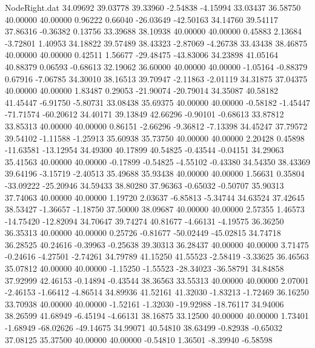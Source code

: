 \begin{filecontents}{NodeRight.dat}
  34.09692   39.03778   39.33960    -2.54838   -4.15994   33.03437   36.58750   40.00000   40.00000    0.96222    0.66040  -26.03649  -42.50163
  34.14760   39.54117   37.86316    -0.36382    0.13756   33.39688   38.10938   40.00000   40.00000    0.45883    2.13684   -3.72801    1.40953
  34.18822   39.57489   38.43323    -2.87069   -4.26738   33.43438   38.46875   40.00000   40.00000    0.42511    1.56677  -29.48475  -43.83006
  34.23898   41.05164   40.88379     0.06593   -0.68613   32.19062   36.60000   40.00000   40.00000   -1.05164   -0.88379    0.67916   -7.06785
  34.30010   38.16513   39.70947    -2.11863   -2.01119   34.31875   37.04375   40.00000   40.00000    1.83487    0.29053  -21.90074  -20.79014
  34.35087   40.58182   41.45447    -6.91750   -5.80731   33.08438   35.69375   40.00000   40.00000   -0.58182   -1.45447  -71.71574  -60.20612
  34.40171   39.13849   42.66296    -0.90101   -0.68613   33.87812   33.85313   40.00000   40.00000    0.86151   -2.66296   -9.36812   -7.13398
  34.45247   37.79572   39.54102    -1.11588   -1.25913   35.60938   35.73750   40.00000   40.00000    2.20428    0.45898  -11.63581  -13.12954
  34.49300   40.17899   40.54825    -0.43544   -0.04151   34.29063   35.41563   40.00000   40.00000   -0.17899   -0.54825   -4.55102   -0.43380
  34.54350   38.43369   39.64196    -3.15719   -2.40513   35.49688   35.93438   40.00000   40.00000    1.56631    0.35804  -33.09222  -25.20946
  34.59433   38.80280   37.96363    -0.65032   -0.50707   35.90313   37.74063   40.00000   40.00000    1.19720    2.03637   -6.85813   -5.34744
  34.63524   37.42645   38.53427    -1.36657   -1.18750   37.50000   38.09687   40.00000   40.00000    2.57355    1.46573  -14.75420  -12.82094
  34.70647   39.74274   40.81677    -4.66131   -4.19575   36.36250   36.35313   40.00000   40.00000    0.25726   -0.81677  -50.02449  -45.02815
  34.74718   36.28525   40.24616    -0.39963   -0.25638   39.30313   36.28437   40.00000   40.00000    3.71475   -0.24616   -4.27501   -2.74261
  34.79789   41.15250   41.55523    -2.58419   -3.33625   36.46563   35.07812   40.00000   40.00000   -1.15250   -1.55523  -28.34023  -36.58791
  34.84858   37.92999   42.46153    -0.14894   -0.43544   38.36563   33.55313   40.00000   40.00000    2.07001   -2.46153   -1.66412   -4.86514
  34.89936   41.52161   41.32030    -1.83213   -1.72469   36.16250   33.70938   40.00000   40.00000   -1.52161   -1.32030  -19.92988  -18.76117
  34.94006   38.26599   41.68949    -6.45194   -4.66131   38.16875   33.12500   40.00000   40.00000    1.73401   -1.68949  -68.02626  -49.14675
  34.99071   40.54810   38.63499    -0.82938   -0.65032   37.08125   35.37500   40.00000   40.00000   -0.54810    1.36501   -8.39940   -6.58598

\end{filecontents}
